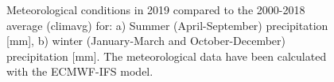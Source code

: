 \begin{figure}[H]
  \caption{Meteorological conditions in 2019 compared to the 2000-2018 average (climavg) for: a) Summer (April-September) precipitation [mm], b) winter (January-March and October-December) precipitation [mm]. The meteorological data have been calculated with the ECMWF-IFS model.} 
\label{fig:prec-avMET}
\end{figure}

